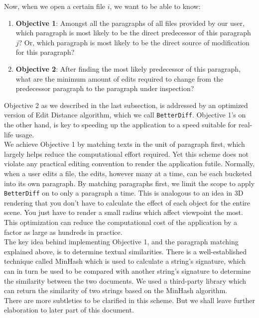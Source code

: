\documentclass{article}
\begin{document}
Now, when we open a certain file $i$, we want to be able to know:
\begin{enumerate}
  \item \textbf{Objective 1}: Amongst all the paragraphs of all files provided by our user, which paragraph is most likely to be the direct predecessor of this paragraph $j$? Or, which paragraph is most likely to be the direct source of modification for this paragraph?
  \item \textbf{Objective 2}: After finding the most likely predecessor of this paragraph, what are the minimum amount of edits required to change from the predecessor paragraph to the paragraph under inspection?
\end{enumerate}

Objective 2 as we described in the last subsection, is addressed by an optimized version of Edit Distance algorithm, which we call \texttt{BetterDiff}. Objective 1's on the other hand, is key to speeding up the application to a speed suitable for real-life usage. \\

We achieve Objective 1 by matching texts in the unit of paragraph first, which largely helps reduce the computational effort required. Yet this scheme does not violate any practical editing convention to render the application futile. Normally, when a user edits a file, the edits, however many at a time, can be each bucketed into its own paragraph. By matching paragraphs first, we limit the scope to apply \texttt{BetterDiff} on to only a paragraph a time.  This is analogous to an idea in 3D rendering that you don't have to calculate the effect of each object for the entire scene. You just have to render a small radius which affect viewpoint the most. This optimization can reduce the computational cost of the application by a factor as large as hundreds in practice. \\

The key idea behind implementing Objective 1, and the paragraph matching explained above, is to determine textual similarities. There is a well-established technique called MinHash which is used to calculate a string's signature, which can in turn be used to be compared with another string's signature to determine the similarity between the two documents. We used a third-party library \cite{minhash} which can return the similarity of two strings based on the MinHash algorithm. \\

There are more subtleties to be clarified in this scheme. But we shall leave further elaboration to later part of this document. 
\end{document}
